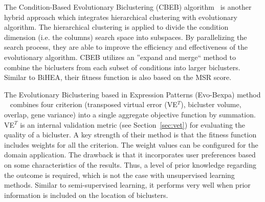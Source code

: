 
The Condition-Based Evolutionary Biclustering (CBEB) algorithm~\cite{huang2012parallelized} is another hybrid approach which integrates hierarchical clustering with evolutionary algorithm.
The hierarchical clustering is applied to divide the condition dimension (i.e. the columns) search space into subspaces.
By parallelizing the search process, they are able to improve the efficiency and effectiveness of the evolutionary algorithm.
CBEB utilizes an ''expand and merge`` method to combine the biclusters from each subset of conditions into larger biclusters.
Similar to BiHEA, their fitness function is also based on the MSR score.

The Evolutionary Biclustering based in Expression Patterns (Evo-Bexpa) method ~\cite{pontes2013configurable} combines four criterion (transposed virtual error (VE$^T$), bicluster volume, overlap, gene variance) into a single aggregate objective function by summation.
VE$^T$ is an internal validation metric (see Section~\ref{sec:vet}) for evaluating the quality of a bicluster.
A key strength of their method is that the fitness function includes weights for all the criterion.
The weight values can be configured for the domain application.
The drawback is that it incorporates user preferences based on some characteristics of the results. Thus, a level of prior knowledge regarding the outcome is required, which is not the case with unsupervised learning methods.
Similar to semi-supervised learning, it performs very well when prior information is included on the location of biclusters.

